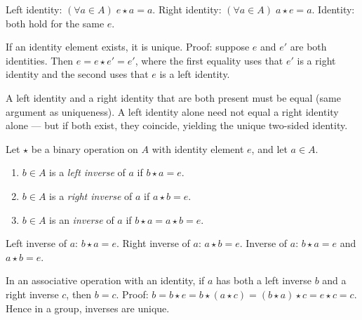 \begin{remark}
Left identity: $(\forall a \in A)\; e \star a = a$.
Right identity: $(\forall a \in A)\; a \star e = a$.
Identity: both hold for the same $e$.
\end{remark}

\begin{remark}
If an identity element exists, it is unique.
Proof: suppose $e$ and $e'$ are both identities.
Then $e = e \star e' = e'$, where the first equality uses that $e'$ is a
right identity and the second uses that $e$ is a left identity.
\end{remark}

\begin{remark}
A left identity and a right identity that are both present must be equal
(same argument as uniqueness).
A left identity alone need not equal a right identity alone —
but if both exist, they coincide, yielding the unique two-sided identity.
\end{remark}

\begin{tcolorbox}[colback=propbox, colframe=propborder, arc=2pt,
  left=6pt, right=6pt, top=4pt, bottom=4pt,
  title={\small\textbf{Definition (Inverse Element)}},
  fonttitle=\small\bfseries]
\label{def:inverse-element}
Let $\star$ be a binary operation on $A$ with identity element $e$,
and let $a \in A$.
\begin{enumerate}[label=(\roman*)]
  \item $b \in A$ is a \emph{left inverse} of $a$ if
        $b \star a = e$.
  \item $b \in A$ is a \emph{right inverse} of $a$ if
        $a \star b = e$.
  \item $b \in A$ is an \emph{inverse} of $a$ if
        $b \star a = a \star b = e$.
\end{enumerate}
\end{tcolorbox}

\begin{remark}
Left inverse of $a$: $b \star a = e$.
Right inverse of $a$: $a \star b = e$.
Inverse of $a$: $b \star a = e$ and $a \star b = e$.
\end{remark}

\begin{remark}
In an associative operation with an identity, if $a$ has both a left
inverse $b$ and a right inverse $c$, then $b = c$.
Proof: $b = b \star e = b \star (a \star c) = (b \star a) \star c = e \star c = c$.
Hence in a group, inverses are unique.
\end{remark}

